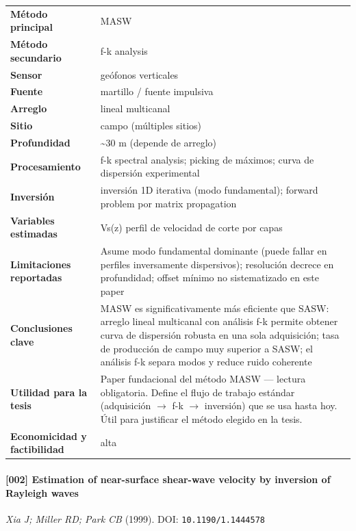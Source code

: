 \begin{center}\scriptsize
\begin{tabularx}{\textwidth}{@{}>{\bfseries}p{3.3cm} X@{}}
\toprule
M\'etodo principal & MASW \\
M\'etodo secundario & f-k analysis \\
Sensor & geófonos verticales \\
Fuente & martillo / fuente impulsiva \\
Arreglo & lineal multicanal \\
Sitio & campo (múltiples sitios) \\
Profundidad & \textasciitilde{}30 m (depende de arreglo) \\
Procesamiento & f-k spectral analysis; picking de máximos; curva de dispersión experimental \\
Inversi\'on & inversión 1D iterativa (modo fundamental); forward problem por matrix propagation \\
Variables estimadas & Vs(z) perfil de velocidad de corte por capas \\
Limitaciones reportadas & Asume modo fundamental dominante (puede fallar en perfiles inversamente dispersivos); resolución decrece en profundidad; offset mínimo no sistematizado en este paper \\
Conclusiones clave & MASW es significativamente más eficiente que SASW: arreglo lineal multicanal con análisis f-k permite obtener curva de dispersión robusta en una sola adquisición; tasa de producción de campo muy superior a SASW; el análisis f-k separa modos y reduce ruido coherente \\
Utilidad para la tesis & Paper fundacional del método MASW --- lectura obligatoria. Define el flujo de trabajo estándar (adquisición $\rightarrow$ f-k $\rightarrow$ inversión) que se usa hasta hoy. Útil para justificar el método elegido en la tesis. \\
Economicidad y factibilidad & alta \\
\bottomrule
\end{tabularx}
\end{center}

\paragraph{[002] Estimation of near-surface shear-wave velocity by inversion of Rayleigh waves} \emph{Xia J; Miller RD; Park CB} (1999).
{\scriptsize DOI: \texttt{10.1190/1.1444578}}

